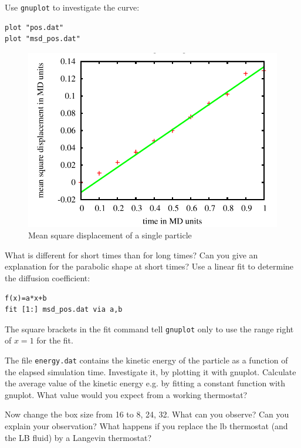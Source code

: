 Use  \lstinline|gnuplot|
to investigate the curve:
{\vspace{0,2cm}\small
\begin{lstlisting}[numbers=none]
plot "pos.dat"
plot "msd_pos.dat"
\end{lstlisting}\vspace{0,2cm}
}
\begin{figure}[h]
  \begin{center}
    \includegraphics{../figs/msd.pdf}
  \end{center}
  \caption{Mean square displacement of a single particle}
\end{figure}

What is different for short times than for long times?
Can you give an explanation for the parabolic shape at short
times?
Use a linear fit to determine the diffusion coefficient:
{\vspace{0,2cm}\small
\begin{lstlisting}[numbers=none]
f(x)=a*x+b
fit [1:] msd_pos.dat via a,b
\end{lstlisting}\vspace{0,2cm}
}
The square brackets in the fit command tell \lstinline{gnuplot}
only to use the range right of $x=1$ for the fit.

The file \lstinline|energy.dat| contains the kinetic energy of the
particle as a function of the elapsed simulation time. Investigate
it, by plotting it with gnuplot. Calculate the average value of 
the kinetic energy e.g. by fitting a constant function with gnuplot.
What value would you expect from a working thermostat?

Now change the box size from 16 to 8, 24, 32. What can you observe?
Can you explain your observation?
What happens if you replace the lb thermostat (and the LB fluid)
by a Langevin thermostat?


